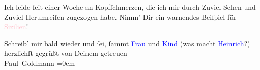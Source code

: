 \pstart
           Ich leide ſeit einer Woche an Kopfſchmerzen, die ich mir durch Zuviel-Sehen und
               Zuviel-Herumreiſen zugezogen habe. Nimm’ Dir ein warnendes Beiſpiel für \textcolor{pink}{Sizilien}{}\ledrightnote{\textcolor{pink}{Sizilien}}!\pend
           
\pstart
           Schreib’ mir bald wieder und ſei, ſammt \textcolor{blue}{Frau}{}\ledrightnote{{$\rightarrow$}\textcolor{blue}{Olga Schnitzler}} und \textcolor{blue}{Kind}{}\ledrightnote{{$\rightarrow$}\textcolor{blue}{Heinrich Schnitzler}} (was macht \textcolor{blue}{Heinrich}{}\ledrightnote{\textcolor{blue}{Heinrich Schnitzler}}?) herzlichſt
               gegrüßt von Deinem getreuen {\\[\baselineskip]}\spacefill\mbox{Paul Goldmann}\pend
           \leftskip=0em{}\endnumbering{}
\begin{anhang}
\end{anhang}
      